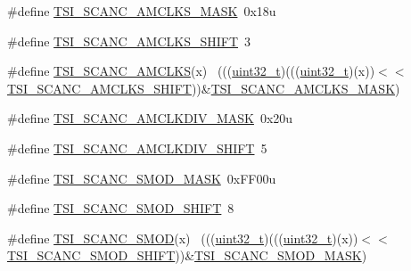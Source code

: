\begin{DoxyCompactItemize}
\item 
\#define \hyperlink{group___t_s_i___register___masks_ga020a126e5eafeff150a1b960bc17679f}{T\+S\+I\+\_\+\+S\+C\+A\+N\+C\+\_\+\+A\+M\+C\+L\+K\+S\+\_\+\+M\+A\+SK}~0x18u
\item 
\#define \hyperlink{group___t_s_i___register___masks_ga4800a19f7603462d1b6ba211b9cb8b5f}{T\+S\+I\+\_\+\+S\+C\+A\+N\+C\+\_\+\+A\+M\+C\+L\+K\+S\+\_\+\+S\+H\+I\+FT}~3
\item 
\#define \hyperlink{group___t_s_i___register___masks_ga3cf9761f62c8570d4d82d8752df90e96}{T\+S\+I\+\_\+\+S\+C\+A\+N\+C\+\_\+\+A\+M\+C\+L\+KS}(x)                                        ~(((\hyperlink{_p_e___types_8h_a33594304e786b158f3fb30289278f5af}{uint32\+\_\+t})(((\hyperlink{_p_e___types_8h_a33594304e786b158f3fb30289278f5af}{uint32\+\_\+t})(x))$<$$<$\hyperlink{group___t_s_i___register___masks_ga4800a19f7603462d1b6ba211b9cb8b5f}{T\+S\+I\+\_\+\+S\+C\+A\+N\+C\+\_\+\+A\+M\+C\+L\+K\+S\+\_\+\+S\+H\+I\+FT}))\&\hyperlink{group___t_s_i___register___masks_ga020a126e5eafeff150a1b960bc17679f}{T\+S\+I\+\_\+\+S\+C\+A\+N\+C\+\_\+\+A\+M\+C\+L\+K\+S\+\_\+\+M\+A\+SK})
\item 
\#define \hyperlink{group___t_s_i___register___masks_ga4fcc6d95912914ff1944a663f486c8aa}{T\+S\+I\+\_\+\+S\+C\+A\+N\+C\+\_\+\+A\+M\+C\+L\+K\+D\+I\+V\+\_\+\+M\+A\+SK}~0x20u
\item 
\#define \hyperlink{group___t_s_i___register___masks_ga80e62da2eb9fd2450ca9f9f503999426}{T\+S\+I\+\_\+\+S\+C\+A\+N\+C\+\_\+\+A\+M\+C\+L\+K\+D\+I\+V\+\_\+\+S\+H\+I\+FT}~5
\item 
\#define \hyperlink{group___t_s_i___register___masks_gabe47ab9c65156f2c6cb9389b96c36843}{T\+S\+I\+\_\+\+S\+C\+A\+N\+C\+\_\+\+S\+M\+O\+D\+\_\+\+M\+A\+SK}~0x\+F\+F00u
\item 
\#define \hyperlink{group___t_s_i___register___masks_gaea5084730b6e76063397e67f558ab423}{T\+S\+I\+\_\+\+S\+C\+A\+N\+C\+\_\+\+S\+M\+O\+D\+\_\+\+S\+H\+I\+FT}~8
\item 
\#define \hyperlink{group___t_s_i___register___masks_gac2872c89d4a12afb8e253c30657386f2}{T\+S\+I\+\_\+\+S\+C\+A\+N\+C\+\_\+\+S\+M\+OD}(x)                                            ~(((\hyperlink{_p_e___types_8h_a33594304e786b158f3fb30289278f5af}{uint32\+\_\+t})(((\hyperlink{_p_e___types_8h_a33594304e786b158f3fb30289278f5af}{uint32\+\_\+t})(x))$<$$<$\hyperlink{group___t_s_i___register___masks_gaea5084730b6e76063397e67f558ab423}{T\+S\+I\+\_\+\+S\+C\+A\+N\+C\+\_\+\+S\+M\+O\+D\+\_\+\+S\+H\+I\+FT}))\&\hyperlink{group___t_s_i___register___masks_gabe47ab9c65156f2c6cb9389b96c36843}{T\+S\+I\+\_\+\+S\+C\+A\+N\+C\+\_\+\+S\+M\+O\+D\+\_\+\+M\+A\+SK})

\end{DoxyCompactItemize}
